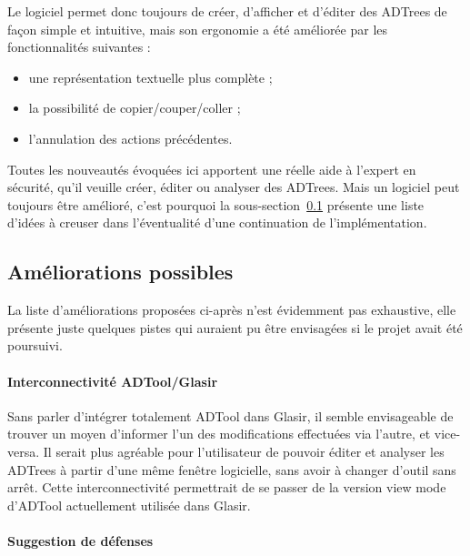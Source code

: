 Le logiciel permet donc toujours de créer, d'afficher et d'éditer des ADTrees de façon simple et intuitive, mais son ergonomie a été améliorée par les fonctionnalités suivantes :
\begin{itemize}
	\item une représentation textuelle plus complète ;
	\item la possibilité de copier/couper/coller ;
	\item l'annulation des actions précédentes.
\end{itemize}

Toutes les nouveautés évoquées ici apportent une réelle aide à l'expert en sécurité, qu'il veuille créer, éditer ou analyser des ADTrees. Mais un logiciel peut toujours être amélioré, c'est pourquoi la {\sc sous-section}~\ref{subsec:encorePlusMieux} présente une liste d'idées à creuser dans l'éventualité d'une continuation de l'implémentation.

\subsection{Améliorations possibles}
\label{subsec:encorePlusMieux}

La liste d'améliorations proposées ci-après n'est évidemment pas exhaustive, elle présente juste quelques pistes qui auraient pu être envisagées si le projet avait été poursuivi.

\paragraph{Interconnectivité ADTool/Glasir} Sans parler d'intégrer totalement ADTool dans Glasir, il semble envisageable de trouver un moyen d'informer l'un des modifications effectuées via l'autre, et vice-versa. Il serait plus agréable pour l'utilisateur de pouvoir éditer et analyser les ADTrees à partir d'une même fenêtre logicielle, sans avoir à changer d'outil sans arrêt. Cette interconnectivité permettrait de se passer de la version \og view mode \fg{} d'ADTool actuellement utilisée dans Glasir. 

\paragraph{Suggestion de défenses}
